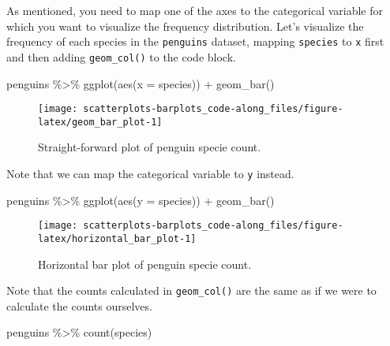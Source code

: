 \documentclass[
]{article}
\newenvironment{Shaded}{\begin{snugshade}}{\end{snugshade}}
\newcommand{\AttributeTok}[1]{\textcolor[rgb]{0.77,0.63,0.00}{#1}}
\newcommand{\FunctionTok}[1]{\textcolor[rgb]{0.00,0.00,0.00}{#1}}
\newcommand{\NormalTok}[1]{#1}
\newcommand{\SpecialCharTok}[1]{\textcolor[rgb]{0.00,0.00,0.00}{#1}}
\begin{document}
As mentioned, you need to map one of the axes to the categorical
variable for which you want to visualize the frequency distribution.
Let's visualize the frequency of each species in the \texttt{penguins}
dataset, mapping \texttt{species} to \texttt{x} first and then adding
\texttt{geom\_col()} to the code block.

\begin{Shaded}
\begin{Highlighting}[]
\NormalTok{penguins }\SpecialCharTok{\%\textgreater{}\%}
  \FunctionTok{ggplot}\NormalTok{(}\FunctionTok{aes}\NormalTok{(}\AttributeTok{x =}\NormalTok{ species)) }\SpecialCharTok{+}
  \FunctionTok{geom\_bar}\NormalTok{()}
\end{Highlighting}
\end{Shaded}

\begin{figure}

{\centering \texttt{[image: scatterplots-barplots\_code-along\_files/figure-latex/geom\_bar\_plot-1]} 

}

\caption{Straight-forward plot of penguin specie count.}\label{fig:geom_bar_plot}
\end{figure}

Note that we can map the categorical variable to \texttt{y} instead.

\begin{Shaded}
\begin{Highlighting}[]
\NormalTok{penguins }\SpecialCharTok{\%\textgreater{}\%}
  \FunctionTok{ggplot}\NormalTok{(}\FunctionTok{aes}\NormalTok{(}\AttributeTok{y =}\NormalTok{ species)) }\SpecialCharTok{+}
  \FunctionTok{geom\_bar}\NormalTok{()}
\end{Highlighting}
\end{Shaded}

\begin{figure}

{\centering \texttt{[image: scatterplots-barplots\_code-along\_files/figure-latex/horizontal\_bar\_plot-1]} 

}

\caption{Horizontal bar plot of penguin specie count.}\label{fig:horizontal_bar_plot}
\end{figure}

Note that the counts calculated in \texttt{geom\_col()} are the same as
if we were to calculate the counts ourselves.

\begin{Shaded}
\begin{Highlighting}[]
\NormalTok{penguins }\SpecialCharTok{\%\textgreater{}\%}
  \FunctionTok{count}\NormalTok{(species)}
\end{Highlighting}
\end{Shaded}
\end{document}
